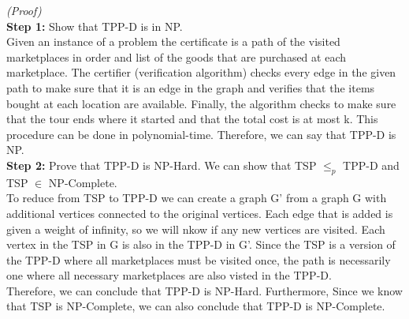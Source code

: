 \documentclass{article}
\begin{document}
\noindent\textit{(Proof)}
\\[.25cm]
\textbf{Step 1: }Show that TPP-D is in NP.
\\[.25cm]
Given an instance of a problem the certificate is a path of the visited marketplaces in order and list of the goods that are purchased at each marketplace. The certifier (verification algorithm) checks every edge in the given path to make sure that it is an edge in the graph and verifies that the items bought at each location are available. Finally, the algorithm checks to make sure that the tour ends where it started and that the total cost is at most k. This procedure can be done in polynomial-time. Therefore, we can say that TPP-D is NP.
\\[.25cm]
\textbf{Step 2: }Prove that TPP-D is NP-Hard. We can show that TSP $\leq _p$ TPP-D and TSP $\in$ NP-Complete. 
\\[.25cm]
To reduce from TSP to TPP-D we can create a graph G' from a graph G with additional vertices connected to the original vertices. Each edge that is added is given a weight of infinity, so we will nkow if any new vertices are visited. Each vertex in the TSP in G is also in the TPP-D in G'. Since the TSP is a version of the TPP-D where all marketplaces must be visited once, the path is necessarily one where all necessary marketplaces are also visted in the TPP-D.\\

Therefore, we can conclude that TPP-D is NP-Hard. Furthermore, Since we know that TSP is NP-Complete, we can also conclude that TPP-D is NP-Complete. 
\end{document}
